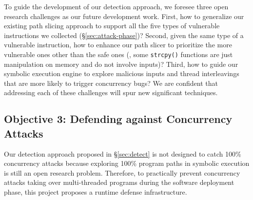 


 To guide the development of our detection 
approach, we foresee three open research challenges as our future development 
work. First, how to generalize our existing path slicing approach to support all the five types of 
vulnerable instructions we collected (\S\ref{sec:attack-phase})? Second, given the same 
type of a vulnerable instruction, how to enhance our path slicer to prioritize the more vulnerable ones other 
than the safe ones (\eg, some \texttt{strcpy()} functions are just 
manipulation on memory and do not involve inputs)? Third, how to guide our symbolic execution engine 
to explore malicious inputs and thread interleavings that are more likely to trigger concurrency 
bugs? We are confident that addressing each of these challenges will spur new 
significant techniques.

\vspace{-.15in}\subsection{Objective 3: Defending against Concurrency 
Attacks}\label{sec:defense}\vspace{-.075in}

Our detection approach proposed in \S\ref{sec:detect} is not 
designed to catch 100\% concurrency attacks because exploring 100\% program 
paths in symbolic execution is still an open research problem. Therefore, to 
practically prevent concurrency attacks taking over multi-threaded programs 
during the software deployment phase, this project proposes a runtime defense 
infrastructure.


